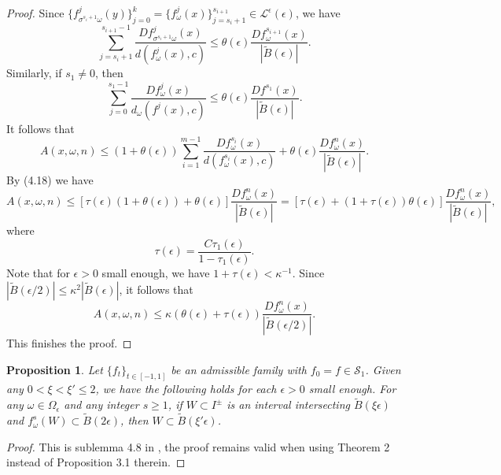 \documentclass[11pt,oneside]{article}
\theoremstyle{plain}
\newtheorem{prop}{Proposition}
\numberwithin{equation}{section}
\numberwithin{figure}{section}
\numberwithin{table}{section}
\begin{document}
\begin{proof}
Since $\{f_{\sigma^{s_i+1}\omega}^j(y) \}_{j=0}^k = \{ f_{\omega}^j(x) \}_{j=s_i + 1}^{s_{i+1}} \in \mathcal L^{\epsilon}(\epsilon)$, we have
\[
\sum_{j = s_i + 1}^{s_{i+1} - 1} \frac{Df_{\sigma^{s_i+1} \omega}^j(x)}{ d (f_{\omega}^j(x), c)} \leq \theta(\epsilon) \frac{Df_{\omega}^{s_{i+1}}(x)}{|\tilde B(\epsilon)|}.
\]
Similarly, if $s_1 \neq 0$, then
\[
\sum_{j = 0}^{s_1 - 1} \frac{Df_{\omega}^j(x)}{ d_{\omega} (f^j(x), c)} \leq \theta(\epsilon) \frac{Df^{s_1}(x)}{|\tilde B(\epsilon)|}.
\]
It follows that 
\[
A(x, \omega, n) \leq (1 + \theta(\epsilon)) \sum_{i=1}^{m-1} \frac{Df_{\omega}^{s_i}(x)}{d(f_{\omega}^{s_i}(x), c)} + \theta(\epsilon) \frac{Df_{\omega}^n(x)}{|\tilde B(\epsilon)|}.
\]
By (4.18) we have
\[
A(x, \omega, n) \leq  [ \tau(\epsilon) ( 1 + \theta(\epsilon)) + \theta(\epsilon) ] \frac{Df_{\omega}^n(x)}{|\tilde B(\epsilon)|} =  [ \tau(\epsilon) + (1 + \tau(\epsilon)) \theta(\epsilon) ] \frac{Df_{\omega}^n(x)}{|\tilde B(\epsilon)|},
\]
where
\[
\tau(\epsilon) = \frac{C \tau_1(\epsilon)}{1 - \tau_1(\epsilon)}.
\]
Note that for $\epsilon > 0$ small enough, we have $1 + \tau(\epsilon) < \kappa^{-1}$. Since $|\tilde B (\epsilon/2)| \leq \kappa^2 |\tilde B(\epsilon)|$, it follows that
\[
A(x, \omega, n) \leq \kappa (\theta(\epsilon) + \tau(\epsilon)) \frac{Df_{\omega}^n(x)}{|\tilde B(\epsilon/2)|}.
\]
This finishes the proof.

\end{proof}




\begin{prop}
Let $\{f_t \}_{t \in [-1, 1]} $ be an admissible family with $f_0 =f \in \mathcal S_1$. Given any $0 < \xi < \xi' \leq 2$, we have the following holds for each $\epsilon>0$ small enough. For any $\omega \in \Omega_{\epsilon}$ and any integer $s \geq 1$, if $W \subset I^{\pm}$ is an interval intersecting $\tilde B(\xi \epsilon)$ and $f_{\omega}^s(W) \subset \tilde B(2 \epsilon)$, then $W \subset \tilde B(\xi' \epsilon)$.
\end{prop}


\begin{proof}

This is sublemma 4.8 in \cite{LR}, the proof remains valid when using Theorem 2 instead of Proposition 3.1 therein.

\end{proof}
\end{document}
